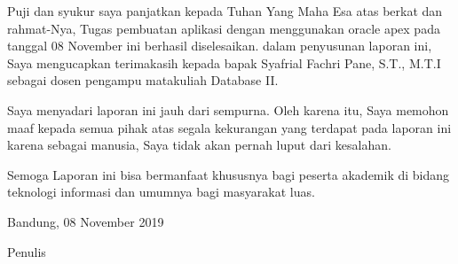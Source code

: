 \begin{acknowledgements}
Puji dan syukur saya panjatkan kepada Tuhan Yang Maha Esa atas berkat dan rahmat-Nya, Tugas pembuatan aplikasi dengan menggunakan oracle apex pada tanggal 08 November ini berhasil diselesaikan. dalam penyusunan laporan ini, Saya mengucapkan terimakasih kepada bapak Syafrial Fachri Pane, S.T., M.T.I sebagai dosen pengampu matakuliah Database II.

Saya menyadari laporan ini jauh dari sempurna. Oleh karena itu, Saya memohon maaf kepada semua pihak atas segala kekurangan yang terdapat pada laporan ini karena sebagai manusia, Saya tidak akan pernah luput dari kesalahan. 

Semoga Laporan ini bisa bermanfaat khususnya bagi peserta akademik di bidang teknologi informasi dan umumnya bagi masyarakat luas. 

\begin{raggedleft}

Bandung, 08 November 2019

Penulis

\end{raggedleft}

\end{acknowledgements}
